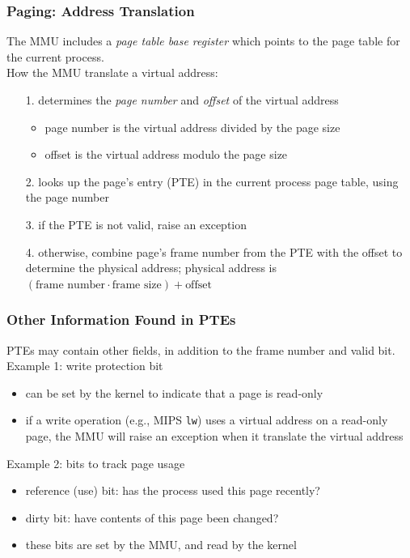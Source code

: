 \documentclass[12pt]{article}
\theoremstyle{plain}
\theoremstyle{definition}
\begin{document}
\subsubsection{Paging: Address Translation}
The MMU includes a \emph{page table base register} which points to the page table for the current process. \\

How the MMU translate a virtual address:
\begin{enumerate}
  \item[1.] determines the \emph{page number} and \emph{offset} of the virtual address
  \begin{itemize}
    \item page number is the virtual address divided by the page size
    \item offset is the virtual address modulo the page size
  \end{itemize}
  \item[2.] looks up the page's entry (PTE) in the current process page table, using the page number
  \item[3.] if the PTE is not valid, raise an exception
  \item[4.] otherwise, combine page's frame number from the PTE with the offset to determine the physical address;
  physical address is $(\text{frame number} \cdot \text{frame size}) + \text{offset}$ \\
\end{enumerate}

\subsubsection{Other Information Found in PTEs}
PTEs may contain other fields, in addition to the frame number and valid bit. \\

Example 1: write protection bit
\begin{itemize}
  \item can be set by the kernel to indicate that a page is read-only
  \item if a write operation (e.g., MIPS \texttt{lw}) uses a virtual address on a read-only page, the MMU will raise an exception when it translate the virtual address
\end{itemize}

Example 2: bits to track page usage
\begin{itemize}
  \item reference (use) bit: has the process used this page recently?
  \item dirty bit: have contents of this page been changed?
  \item these bits are set by the MMU, and read by the kernel
\end{itemize}
\end{document}

